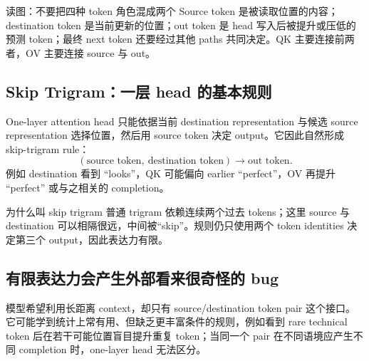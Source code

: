 \begin{knowledgebox}{读图：不要把四种 token 角色混成两个}
Source token 是被读取位置的内容；destination token 是当前更新的位置；out token 是 head 写入后被提升或压低的预测 token；最终 next token 还要经过其他 paths 共同决定。QK 主要连接前两者，OV 主要连接 source 与 out。
\end{knowledgebox}


\subsection{Skip Trigram：一层 head 的基本规则}

One-layer attention head 只能依据当前 destination representation 与候选 source representation 选择位置，然后用 source token 决定 output。它因此自然形成 skip-trigram rule：
\[
(\text{source token},\ \text{destination token})
\longrightarrow \text{out token}.
\]
例如 destination 看到 “looks”，QK 可能偏向 earlier “perfect”，OV 再提升 “perfect” 或与之相关的 completion。



\begin{importantbox}{为什么叫 skip trigram}
普通 trigram 依赖连续两个过去 tokens；这里 source 与 destination 可以相隔很远，中间被“skip”。规则仍只使用两个 token identities 决定第三个 output，因此表达力有限。
\end{importantbox}

\subsection{有限表达力会产生外部看来很奇怪的 bug}

模型希望利用长距离 context，却只有 source/destination token pair 这个接口。它可能学到统计上常有用、但缺乏更丰富条件的规则，例如看到 rare technical token 后在若干可能位置盲目提升重复 token；当同一个 pair 在不同语境应产生不同 completion 时，one-layer head 无法区分。


